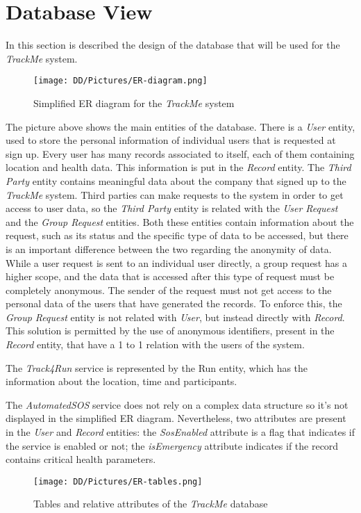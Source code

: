 \section{Database View}

In this section is described the design of the database that will be used for the \textit{TrackMe} system. 


\begin{figure}[H]
\texttt{[image: DD/Pictures/ER-diagram.png]}
\centering
\caption{Simplified ER diagram for the \textit{TrackMe} system}
\end{figure}

The picture above shows the main entities of the database. There is a \textit{User} entity, used to store the personal information of individual users that is requested at sign up. Every user has many records associated to itself, each of them containing location and health data. This information is put in the \textit{Record} entity. The \textit{Third Party} entity contains meaningful data about the company that signed up to the \textit{TrackMe} system. Third parties can make requests to the system in order to get access to user data, so the \textit{Third Party} entity is related with the \textit{User Request} and the \textit{Group Request} entities. Both these entities contain information about the request, such as its status and the specific type of data to be accessed, but there is an important difference between the two regarding the anonymity of data. While a user request is sent to an individual user directly, a group request has a higher scope, and the data that 
is accessed after this type of request must be completely anonymous. The sender of the request must not get access to the personal data of the users that have generated the records. To enforce this, the \textit{Group Request} entity is not related with \textit{User}, but instead directly with \textit{Record}. This solution is permitted by the use of anonymous identifiers, present in the \textit{Record} entity, that have a 1 to 1 relation with the users of the system.

The \textit{Track4Run} service is represented by the Run entity, which has the information about the location, time and participants.


The \textit{AutomatedSOS} service does not rely on a complex data structure so it’s not displayed in the simplified ER diagram. Nevertheless, two attributes are present in the \textit{User} and \textit{Record} entities: the \textit{SosEnabled} attribute is a flag that indicates if the service is enabled or not; the \textit{isEmergency} attribute indicates if the record contains critical health parameters.

\begin{figure}[H]
\texttt{[image: DD/Pictures/ER-tables.png]}
\centering
\caption{Tables and relative attributes of the \textit{TrackMe} database}
\end{figure}